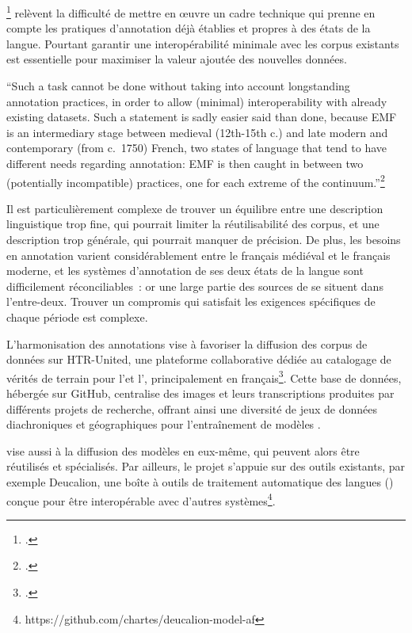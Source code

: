 \citeauthor{gabay_standardizing_2020}\footcite{gabay_standardizing_2020} relèvent la
difficulté de mettre en œuvre un cadre technique qui prenne en compte
les pratiques d'annotation déjà établies et propres à des états de la langue. Pourtant garantir une
interopérabilité minimale avec les corpus existants est essentielle pour
maximiser la valeur ajoutée des nouvelles données.

\begin{kwote}                     
	``Such a task cannot be done without taking into account longstanding
	annotation practices, in order to allow (minimal) interoperability with
	already existing datasets. Such a statement is sadly easier said than
	done, because EMF is an intermediary stage between medieval (12th-15th
	c.) and late modern and contemporary (from c.~1750) French, two states
	of language that tend to have different needs regarding annotation: EMF
	is then caught in between two (potentially incompatible) practices, one
	for each extreme of the continuum.''\footcite[p.2]{gabay_standardizing_2020}
\end{kwote}     

Il est particulièrement complexe de trouver un équilibre entre une
description linguistique trop fine, qui pourrait limiter
la réutilisabilité des corpus, et une description trop générale, qui pourrait
manquer de précision. De plus, les besoins en annotation varient considérablement
entre le français médiéval et le français moderne, et les systèmes
d'annotation de ses deux états de la langue sont difficilement
réconciliables~: or une large partie des sources de \gaga se
situent dans l'entre-deux. Trouver un compromis qui satisfait les
exigences spécifiques de chaque période est complexe.

L'harmonisation des annotations vise à favoriser la diffusion des corpus
de données sur HTR-United, une plateforme collaborative dédiée au
catalogage de vérités de terrain pour l'\htr et l'\ocr, principalement en
français\footcite{chague_htr-united_2021}. Cette base de
données, hébergée sur GitHub, centralise des images et leurs
transcriptions produites par différents projets de recherche, offrant
ainsi une diversité de jeux de données diachroniques et géographiques
pour l'entraînement de modèles \htr.

\gaga vise aussi à la diffusion des modèles en eux-même, qui peuvent alors être réutilisés et spécialisés. Par ailleurs, le projet
s'appuie sur des outils existants, par exemple Deucalion, une boîte à
outils de traitement automatique des langues (\tal) conçue pour être
interopérable avec d'autres systèmes\footnote{https://github.com/chartes/deucalion-model-af}.